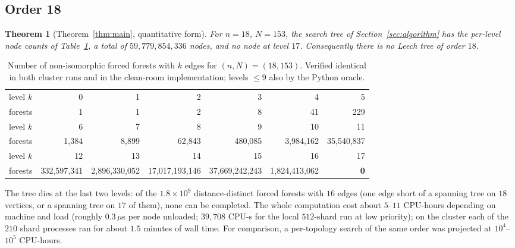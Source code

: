 \documentclass[11pt,a4paper]{article}
\theoremstyle{plain}
\newtheorem{theorem}{Theorem}[section]
\theoremstyle{remark}
\begin{document}
\subsection{Order 18}\label{sec:order18}

\begin{theorem}[Theorem~\ref{thm:main}, quantitative form]\label{thm:quant}
For $n=18$, $N=153$, the search tree of Section~\ref{sec:algorithm} has the
per-level node counts of Table~\ref{tab:levels18}, a total of
$59{,}779{,}854{,}336$ nodes, and no node at level $17$.  Consequently there is
no Leech tree of order $18$.
\end{theorem}

\begin{table}[ht]
\centering
\caption{Number of non-isomorphic forced forests with $k$ edges for
$(n,N)=(18,153)$.  Verified identical in both cluster runs and in the
clean-room implementation; levels $\le 9$ also by the Python oracle.}
\label{tab:levels18}
\small
\begin{tabular}{@{}l*{6}{r}@{}}
\toprule
level $k$ & 0 & 1 & 2 & 3 & 4 & 5\\
forests & 1 & 1 & 2 & 8 & 41 & 229\\
\midrule
level $k$ & 6 & 7 & 8 & 9 & 10 & 11\\
forests & 1,384 & 8,899 & 62,843 & 480,085 & 3,984,162 & 35,540,837\\
\midrule
level $k$ & 12 & 13 & 14 & 15 & 16 & 17\\
forests & 332,597,341 & 2,896,330,052 & 17,017,193,146 & 37,669,242,243 & 1,824,413,062 & \textbf{0}\\
\bottomrule
\end{tabular}
\end{table}

The tree dies at the last two levels: of the $1.8\times10^9$ distance-distinct
forced forests with $16$ edges (one edge short of a spanning tree on $18$
vertices, or a spanning tree on $17$ of them), none can be completed.  The whole
computation cost about $5$--$11$ CPU-hours depending on machine and load
(roughly $0.3\,\mu$s per node unloaded; $39{,}708$ CPU-s for the local
$512$-shard run at low priority); on the cluster each of the $210$ shard
processes ran for about $1.5$ minutes of wall time.  For comparison, a
per-topology search of the same order was projected at $10^4$--$10^5$ CPU-hours.
\end{document}
